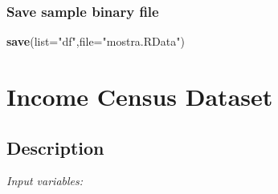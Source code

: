 \documentclass[12pt,]{article}
\newenvironment{Shaded}{\begin{snugshade}}{\end{snugshade}}
\newcommand{\DataTypeTok}[1]{\textcolor[rgb]{0.13,0.29,0.53}{#1}}
\newcommand{\KeywordTok}[1]{\textcolor[rgb]{0.13,0.29,0.53}{\textbf{#1}}}
\newcommand{\NormalTok}[1]{#1}
\newcommand{\StringTok}[1]{\textcolor[rgb]{0.31,0.60,0.02}{#1}}
\begin{document}
\hypertarget{save-sample-binary-file}{%
\subsubsection{Save sample binary file}\label{save-sample-binary-file}}

\begin{Shaded}
\begin{Highlighting}[]
\KeywordTok{save}\NormalTok{(}\DataTypeTok{list=}\StringTok{"df"}\NormalTok{,}\DataTypeTok{file=}\StringTok{"mostra.RData"}\NormalTok{)}
\end{Highlighting}
\end{Shaded}

\hypertarget{income-census-dataset}{%
\section{Income Census Dataset}\label{income-census-dataset}}

\hypertarget{description}{%
\subsection{Description}\label{description}}

\emph{Input variables:}
\end{document}
